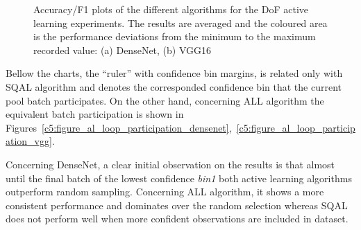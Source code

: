 \begin{figure}[h!]
    \centering  
    \caption{Accuracy/F1 plots of the different algorithms for the DoF active learning experiments. The results are averaged and the coloured area is the performance deviations from the minimum to the maximum recorded value: (a) DenseNet, (b) VGG16}
    \label{c5:figure_simulation_acc_densenet_vgg}
\end{figure}

Bellow the charts, the ``ruler'' with confidence bin margins, is related only with SQAL algorithm and denotes the corresponded confidence bin that the current pool batch participates. On the other hand, concerning ALL algorithm the equivalent batch participation is shown in Figures~\ref{c5:figure_al_loop_participation_densenet},~\ref{c5:figure_al_loop_participation_vgg}.

Concerning DenseNet, a clear initial observation on the results is that almost until the final batch of the lowest confidence \textit{bin1} both active learning algorithms outperform random sampling. Concerning ALL algorithm, it shows a more consistent performance and dominates over the random selection whereas SQAL does not perform well when more confident observations are included in dataset.


